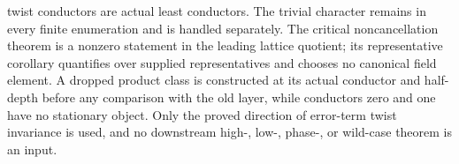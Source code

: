 \begin{lemma}
twist conductors are actual least conductors.  The trivial character remains
in every finite enumeration and is handled separately.  The critical
noncancellation theorem is a nonzero statement in the leading lattice
quotient; its representative corollary quantifies over supplied
representatives and chooses no canonical field element.  A dropped product
class is constructed at its actual conductor and half-depth before any
comparison with the old layer, while conductors zero and one have no
stationary object.  Only the proved direction of error-term twist invariance
is used, and no downstream high-, low-, phase-, or wild-case theorem is an
input.
\end{lemma}
